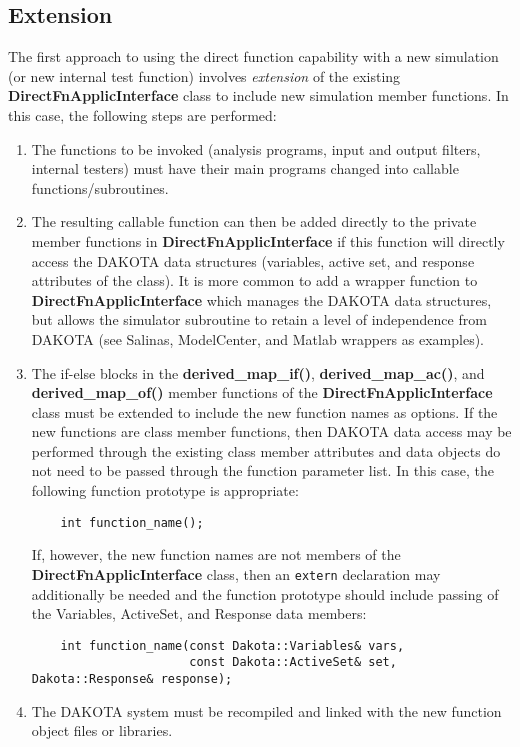 \subsection{Extension}\label{advint:direct:extension}

The first approach to using the direct function capability with a new
simulation (or new internal test function) involves \emph{extension}
of the existing \textbf{DirectFnApplicInterface} class to include new
simulation member functions.  In this case, the following steps are
performed:
\begin{enumerate}
\item The functions to be invoked (analysis programs, input and
  output filters, internal testers) must have their main programs
  changed into callable functions/subroutines.

\item The resulting callable function can then be added directly
  to the private member functions in \textbf{DirectFnApplicInterface}
  if this function will directly access the DAKOTA data structures
  (variables, active set, and response attributes of the class). It is
  more common to add a wrapper function to
  \textbf{DirectFnApplicInterface} which manages the DAKOTA data
  structures, but allows the simulator subroutine to retain a level of
  independence from DAKOTA (see Salinas, ModelCenter, and Matlab
  wrappers as examples).

\item The if-else blocks in the \textbf{derived\_map\_if()},
  \textbf{derived\_map\_ac()}, and \textbf{derived\_map\_of()} member
  functions of the \textbf{DirectFnApplicInterface} class must be
  extended to include the new function names as options. If the new
  functions are class member functions, then DAKOTA data access may be
  performed through the existing class member attributes and data
  objects do not need to be passed through the function parameter
  list. In this case, the following function prototype is appropriate:
\begin{small}
\begin{verbatim}
    int function_name();
\end{verbatim}
\end{small}
  If, however, the new function names are not members of the
  \textbf{DirectFnApplicInterface} class, then an \texttt{extern}
  declaration may additionally be needed and the function prototype
  should include passing of the Variables, ActiveSet, and Response
  data members:
\begin{small}
\begin{verbatim}
    int function_name(const Dakota::Variables& vars,
                      const Dakota::ActiveSet& set, Dakota::Response& response);
\end{verbatim}
\end{small}

\item The DAKOTA system must be recompiled and linked with the new
  function object files or libraries.
\end{enumerate}

